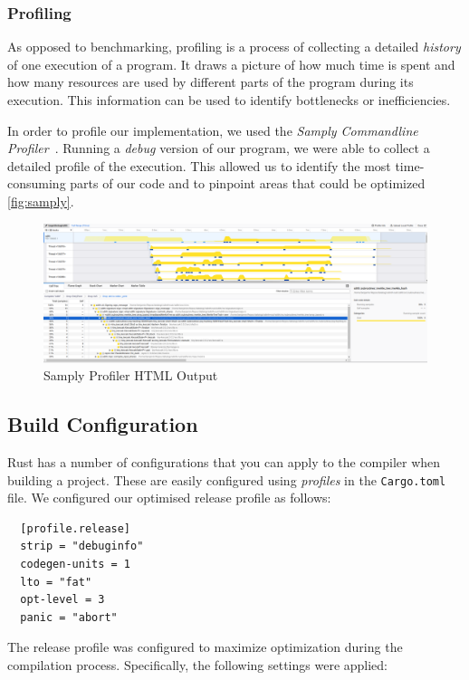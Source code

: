 \documentclass[11pt]{report}
\theoremstyle{definition}
\theoremstyle{plain}
\begin{document}
\subsubsection{Profiling}\label{ch:prelim:sec:rust:sub:profiling}
As opposed to benchmarking, profiling is a process of collecting a detailed \textit{history} of one execution of a program. It draws a picture of how much time is spent and how many resources are used by different parts of the program during its execution. This information can be used to identify bottlenecks or inefficiencies.

In order to profile our implementation, we used the \textit{Samply Commandline Profiler}~\cite{samply}. Running a \textit{debug} version of our program, we were able to collect a detailed profile of the execution. This allowed us to identify the most time-consuming parts of our code and to pinpoint areas that could be optimized \autoref{fig:samply}.

\begin{figure}[H]
  \centering
  \includegraphics[width=\textwidth]{images/samply.png}
  \caption{Samply Profiler HTML Output}
  \label{fig:samply}
\end{figure}

\subsection{Build Configuration}

Rust has a number of configurations that you can apply to the compiler when building a project. These are easily configured using \textit{profiles} in the \texttt{Cargo.toml} file. We configured our optimised release profile as follows:

\begin{verbatim}
  [profile.release]
  strip = "debuginfo"
  codegen-units = 1  
  lto = "fat"        
  opt-level = 3      
  panic = "abort"
\end{verbatim}

The release profile was configured to maximize optimization during the compilation process. Specifically, the following settings were applied:
\end{document}
